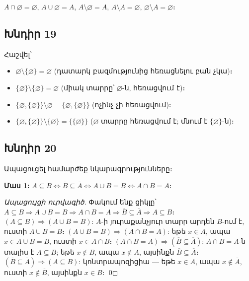 $\boxed{A \cap \varnothing = \varnothing}$, \quad $\boxed{A \cup \varnothing = A}$, \quad $\boxed{A \setminus \varnothing = A}$, \quad $\boxed{A \setminus A = \varnothing}$, \quad $\boxed{\varnothing \setminus A = \varnothing}$։

\subsection*{Խնդիր 19}
Հաշվել՝

\begin{itemize}
  \item $\varnothing \setminus \{\varnothing\} = \boxed{\varnothing}$ \quad (դատարկ բազմությունից հեռացնելու բան չկա)։
  \item $\{\varnothing\} \setminus \{\varnothing\} = \boxed{\varnothing}$ \quad (միակ տարրը՝ $\varnothing$-ն, հեռացվում է)։
  \item $\{\varnothing, \{\varnothing\}\} \setminus \varnothing = \boxed{\{\varnothing, \{\varnothing\}\}}$ \quad (ոչինչ չի հեռացվում)։
  \item $\{\varnothing, \{\varnothing\}\} \setminus \{\varnothing\} = \boxed{\{\{\varnothing\}\}}$ \quad ($\varnothing$ տարրը հեռացվում է; մնում է $\{\varnothing\}$-ն)։
\end{itemize}

\subsection*{Խնդիր 20}
Ապացուցել համարժեք նկարագրությունները։

\textbf{Մաս 1:} $A \subseteq B \iff \overline{B} \subseteq \overline{A} \iff A \cup B = B \iff A \cap B = A$։

\textit{Ապացույցի ուրվագիծ.} Փակում ենք ցիկլը՝ $A \subseteq B \Rightarrow A \cup B = B \Rightarrow A \cap B = A \Rightarrow \overline{B} \subseteq \overline{A} \Rightarrow A \subseteq B$։
$(A \subseteq B) \Rightarrow (A \cup B = B)$: $A$-ի յուրաքանչյուր տարր արդեն $B$-ում է, ուստի $A \cup B = B$։
$(A \cup B = B) \Rightarrow (A \cap B = A)$: եթե $x \in A$, ապա $x \in A \cup B = B$, ուստի $x \in A \cap B$։
$(A \cap B = A) \Rightarrow (\overline{B} \subseteq \overline{A})$: $A \cap B = A$-ն տալիս է $A \subseteq B$; եթե $x \notin B$, ապա $x \notin A$, այսինքն $\overline{B} \subseteq \overline{A}$։
$(\overline{B} \subseteq \overline{A}) \Rightarrow (A \subseteq B)$: կոնտրապոզիցիա --- եթե $x \in A$, ապա $x \notin \overline{A}$, ուստի $x \notin \overline{B}$, այսինքն $x \in B$։ \qed

